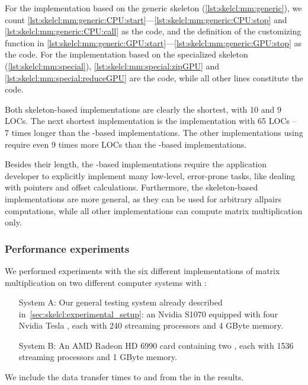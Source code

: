 For the implementation based on the generic \allpairs skeleton (\autoref{lst:skelcl:mm:generic}), we count \autoref{lst:skelcl:mm:generic:CPU:start}---\autoref{lst:skelcl:mm:generic:CPU:stop} and \autoref{lst:skelcl:mm:generic:CPU:call} as the \CPU code, and the definition of the customizing function in \autoref{lst:skelcl:mm:generic:GPU:start}---\autoref{lst:skelcl:mm:generic:GPU:stop} as the \GPU code.
For the implementation based on the specialized \allpairs skeleton (\autoref{lst:skelcl:mm:special}), \autoref{lst:skelcl:mm:special:zipGPU} and \autoref{lst:skelcl:mm:special:reduceGPU} are the \GPU code, while all other lines constitute the \CPU code.

Both skeleton-based implementations are clearly the shortest, with 10 and 9 LOCs.
The next shortest implementation is the \CUBLAS implementation with 65 LOCs -- 7 times longer than the \SkelCL-based implementations.
The other implementations using \OpenCL require even 9 times more LOCs than the \SkelCL-based implementations.

Besides their length, the \OpenCL-based implementations require the application developer to explicitly implement many low-level, error-prone tasks, like dealing with pointers and offset calculations.
Furthermore, the skeleton-based implementations are more general, as they can be used for arbitrary allpairs computations, while all other implementations can compute matrix multiplication only.


\subsubsection*{Performance experiments}
We performed experiments with the six different implementations of matrix multiplication on two different computer systems with \GPUs:
\begin{itemize}[leftmargin=50pt]
  \item[System A:] Our general testing system already described in~\autoref{sec:skelcl:experimental_setup}:
    an Nvidia S1070 equipped with four Nvidia Tesla \GPUs, each with 240 streaming processors and 4 GByte memory.
  \item[System B:] An AMD Radeon HD 6990 card containing two \GPUs, each with 1536 streaming processors and 1 GByte memory.
\end{itemize}

\noindent
We include the data transfer times to and from the \GPU in the results. %



